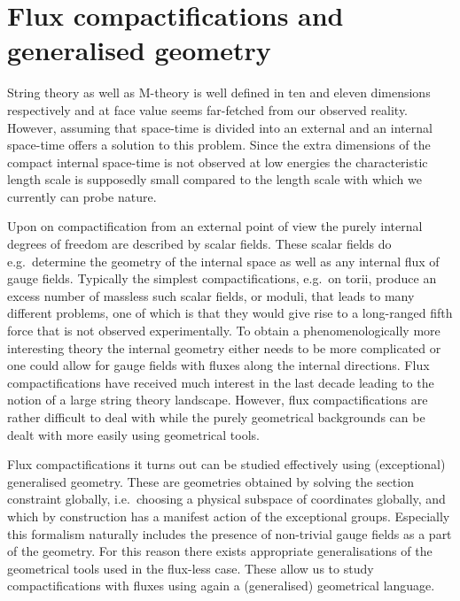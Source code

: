 \section{Flux compactifications and generalised geometry}
String theory as well as M-theory is well defined in ten and eleven dimensions respectively and at face value seems far-fetched from our observed reality. However, assuming that space-time is divided into an external and an internal space-time offers a solution to this problem. Since the extra dimensions of the compact internal space-time is not observed at low energies the characteristic length scale is supposedly small compared to the length scale with which we currently can probe nature.

Upon on compactification from an external point of view the purely internal degrees of freedom are described by scalar fields. These scalar fields do e.g.\ determine the geometry of the internal space as well as any internal flux of gauge fields. Typically the simplest compactifications, e.g.\ on torii, produce an excess number of massless such scalar fields, or moduli, that leads to many different problems, one of which is that they would give rise to a long-ranged fifth force that is not observed experimentally. To obtain a phenomenologically more interesting theory the internal geometry either needs to be more complicated or one could allow for gauge fields with fluxes along the internal directions. Flux compactifications \cite{Grana:2005jc} have received much interest in the last decade leading to the notion of a large string theory landscape. However, flux compactifications are rather difficult to deal with while the purely geometrical backgrounds can be dealt with more easily using geometrical tools. 

Flux compactifications it turns out can be studied effectively using (exceptional) generalised geometry. These are geometries obtained by solving the section constraint globally, i.e.\ choosing a physical subspace of coordinates globally, and which by construction has a manifest action of the exceptional groups. Especially this formalism naturally includes the presence of non-trivial gauge fields as a part of the geometry. For this reason there exists appropriate generalisations of the geometrical tools used in the flux-less case. These allow us to study compactifications with fluxes using again a (generalised) geometrical language.\cite{Grana:2009im,Grana:2016dyl,Coimbra:2012af,Ashmore:2015joa}


